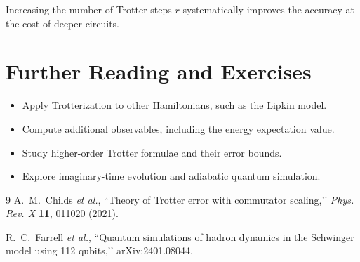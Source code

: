 \documentclass[11pt]{article}
\begin{document}
Increasing the number of Trotter steps $r$ systematically improves the accuracy at the cost of deeper circuits.

\section{Further Reading and Exercises}

\begin{itemize}
\item Apply Trotterization to other Hamiltonians, such as the Lipkin model.
\item Compute additional observables, including the energy expectation value.
\item Study higher-order Trotter formulae and their error bounds.
\item Explore imaginary-time evolution and adiabatic quantum simulation.
\end{itemize}

\begin{thebibliography}{9}
  A.~M.~Childs \emph{et al.}, ``Theory of Trotter error with commutator scaling,’’ \emph{Phys. Rev. X} \textbf{11}, 011020 (2021).

  R.~C.~Farrell \emph{et al.}, ``Quantum simulations of hadron dynamics in the Schwinger model using 112 qubits,’’ arXiv:2401.08044.
\end{thebibliography}
\end{document}
